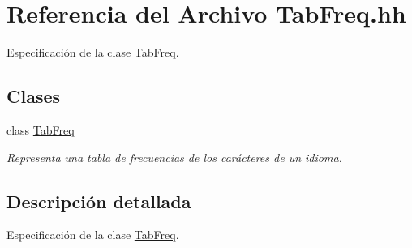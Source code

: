 \hypertarget{_tab_freq_8hh}{}\section{Referencia del Archivo Tab\+Freq.\+hh}
\label{_tab_freq_8hh}


Especificación de la clase \hyperlink{class_tab_freq}{Tab\+Freq}.  


\subsection*{Clases}
\begin{DoxyCompactItemize}
\item 
class \hyperlink{class_tab_freq}{Tab\+Freq}
\begin{DoxyCompactList}\small\item\em Representa una tabla de frecuencias de los carácteres de un idioma. \end{DoxyCompactList}\end{DoxyCompactItemize}


\subsection{Descripción detallada}
Especificación de la clase \hyperlink{class_tab_freq}{Tab\+Freq}. 

